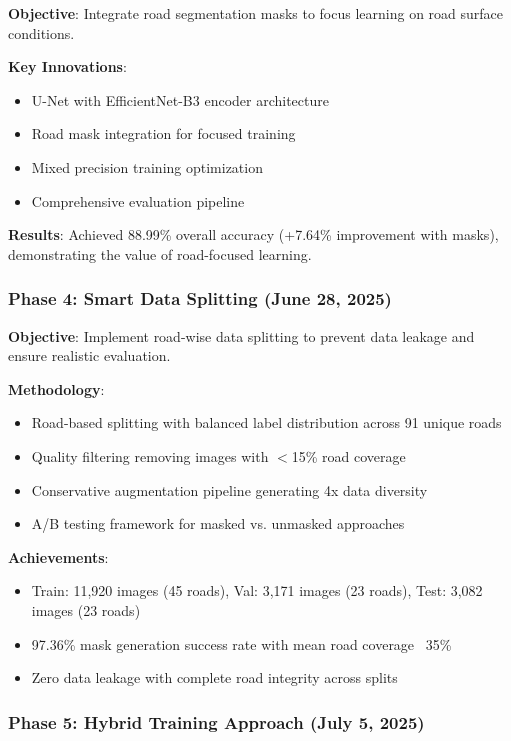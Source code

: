 \documentclass[12pt]{article}
\begin{document}
\textbf{Objective}: Integrate road segmentation masks to focus learning on road surface conditions.

\textbf{Key Innovations}:
\begin{itemize}[itemsep=1pt,parsep=0pt,topsep=2pt]
\item U-Net with EfficientNet-B3 encoder architecture
\item Road mask integration for focused training
\item Mixed precision training optimization
\item Comprehensive evaluation pipeline
\end{itemize}

\textbf{Results}: Achieved 88.99\% overall accuracy (+7.64\% improvement with masks), demonstrating the value of road-focused learning.

\subsubsection{Phase 4: Smart Data Splitting (June 28, 2025)}

\textbf{Objective}: Implement road-wise data splitting to prevent data leakage and ensure realistic evaluation.

\textbf{Methodology}:
\begin{itemize}[itemsep=1pt,parsep=0pt,topsep=2pt]
\item Road-based splitting with balanced label distribution across 91 unique roads
\item Quality filtering removing images with $<$15\% road coverage
\item Conservative augmentation pipeline generating 4x data diversity
\item A/B testing framework for masked vs. unmasked approaches
\end{itemize}

\textbf{Achievements}:
\begin{itemize}[itemsep=1pt,parsep=0pt,topsep=2pt]
\item Train: 11,920 images (45 roads), Val: 3,171 images (23 roads), Test: 3,082 images (23 roads)
\item 97.36\% mask generation success rate with mean road coverage ~35\%
\item Zero data leakage with complete road integrity across splits
\end{itemize}

\subsubsection{Phase 5: Hybrid Training Approach (July 5, 2025)}
\end{document}
